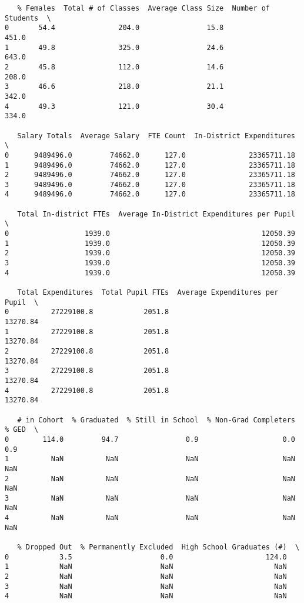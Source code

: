 \documentclass[11pt]{article}
\begin{document}
\begin{verbatim}
   % Females  Total # of Classes  Average Class Size  Number of Students  \
0       54.4               204.0                15.8               451.0   
1       49.8               325.0                24.6               643.0   
2       45.8               112.0                14.6               208.0   
3       46.6               218.0                21.1               342.0   
4       49.3               121.0                30.4               334.0   

   Salary Totals  Average Salary  FTE Count  In-District Expenditures  \
0      9489496.0         74662.0      127.0               23365711.18   
1      9489496.0         74662.0      127.0               23365711.18   
2      9489496.0         74662.0      127.0               23365711.18   
3      9489496.0         74662.0      127.0               23365711.18   
4      9489496.0         74662.0      127.0               23365711.18   

   Total In-district FTEs  Average In-District Expenditures per Pupil  \
0                  1939.0                                    12050.39   
1                  1939.0                                    12050.39   
2                  1939.0                                    12050.39   
3                  1939.0                                    12050.39   
4                  1939.0                                    12050.39   

   Total Expenditures  Total Pupil FTEs  Average Expenditures per Pupil  \
0          27229100.8            2051.8                        13270.84   
1          27229100.8            2051.8                        13270.84   
2          27229100.8            2051.8                        13270.84   
3          27229100.8            2051.8                        13270.84   
4          27229100.8            2051.8                        13270.84   

   # in Cohort  % Graduated  % Still in School  % Non-Grad Completers  % GED  \
0        114.0         94.7                0.9                    0.0    0.9   
1          NaN          NaN                NaN                    NaN    NaN   
2          NaN          NaN                NaN                    NaN    NaN   
3          NaN          NaN                NaN                    NaN    NaN   
4          NaN          NaN                NaN                    NaN    NaN   

   % Dropped Out  % Permanently Excluded  High School Graduates (#)  \
0            3.5                     0.0                      124.0   
1            NaN                     NaN                        NaN   
2            NaN                     NaN                        NaN   
3            NaN                     NaN                        NaN   
4            NaN                     NaN                        NaN   


\end{verbatim}
\end{document}
